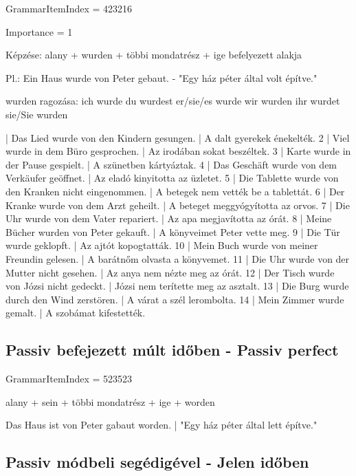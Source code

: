 \documentclass{article}
\newenvironment{desc}{\verbatim}{\endverbatim}
\newenvironment{exmp}{\verbatim}{\endverbatim}
\begin{document}
GrammarItemIndex = 423216

Importance = 1

\begin{desc}
Képzése: alany + wurden + többi mondatrész + ige befelyezett alakja

Pl.: Ein Haus wurde von Peter gebaut. - "Egy ház péter által volt építve."

wurden ragozása:
ich wurde
du wurdest
er/sie/es wurde
wir wurden
ihr wurdet
sie/Sie wurden
\end{desc}

\begin{exmp}
1 | Das Lied wurde von den Kindern gesungen. | A dalt gyerekek énekelték.
2 | Viel wurde in dem Büro gesprochen. | Az irodában sokat beszéltek.
3 | Karte wurde in der Pause gespielt. | A szünetben kártyáztak.
4 | Das Geschäft wurde von dem Verkäufer geöffnet. | Az eladó kinyitotta az üzletet.
5 | Die Tablette wurde von den Kranken nicht eingenommen. | A betegek nem vették be a tablettát.
6 | Der Kranke wurde von dem Arzt geheilt. | A beteget meggyógyította az orvos.
7 | Die Uhr wurde von dem Vater repariert. | Az apa megjavította az órát.
8 | Meine Bücher wurden von Peter gekauft. | A könyveimet Peter vette meg.
9 | Die Tür wurde geklopft. | Az ajtót kopogtatták.
10 | Mein Buch wurde von meiner Freundin gelesen. | A barátnőm olvasta a könyvemet.
11 | Die Uhr wurde von der Mutter nicht gesehen. | Az anya nem nézte meg az órát.
12 | Der Tisch wurde von Józsi nicht gedeckt. | Józsi nem terítette meg az asztalt.
13 | Die Burg wurde durch den Wind zerstören. | A várat a szél lerombolta.
14 | Mein Zimmer wurde gemalt. | A szobámat kifestették.
\end{exmp}

\subsection{Passiv befejezett múlt időben - Passiv perfect}

GrammarItemIndex = 523523

\begin{desc}
alany + sein + többi mondatrész + ige + worden

Das Haus ist von Peter gabaut worden. | "Egy ház péter által lett építve."
\end{desc}

\subsection{Passiv módbeli segédigével - Jelen időben}
\end{document}
